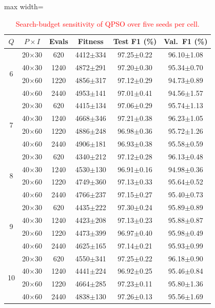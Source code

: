\documentclass[11pt]{article}
\begin{document}
\begin{table}[H]
\centering
\scriptsize
\caption{\textcolor{red}{Search-budget sensitivity of QPSO over five seeds per cell.}}

\color{red}
\setlength{\tabcolsep}{3pt}
\begin{adjustbox}{max width=\linewidth}
\begin{tabular}{cccccc}
\hline\toprule
$Q$ & $P{\times}I$ & Evals & Fitness & Test F1 (\%) & Val.\ F1 (\%) \\
\hline\toprule
\multirow{4}{*}{6} & 20$\times$30 & 620 & 4412$\pm$334 & 97.25$\pm$0.22 & 96.10$\pm$1.08 \\
 & 40$\times$30 & 1240 & 4872$\pm$291 & 97.20$\pm$0.30 & 95.34$\pm$0.70 \\
 & 20$\times$60 & 1220 & 4856$\pm$317 & 97.12$\pm$0.29 & 94.73$\pm$0.89 \\
 & 40$\times$60 & 2440 & 4953$\pm$141 & 97.01$\pm$0.41 & 94.56$\pm$1.57 \\
\midrule
\multirow{4}{*}{7} & 20$\times$30 & 620 & 4415$\pm$134 & 97.06$\pm$0.29 & 95.74$\pm$1.13 \\
 & 40$\times$30 & 1240 & 4668$\pm$346 & 97.21$\pm$0.38 & 96.23$\pm$1.05 \\
 & 20$\times$60 & 1220 & 4886$\pm$248 & 96.98$\pm$0.36 & 95.72$\pm$1.26 \\
 & 40$\times$60 & 2440 & 4906$\pm$181 & 96.93$\pm$0.38 & 95.58$\pm$0.59 \\
\midrule
\multirow{4}{*}{8} & 20$\times$30 & 620 & 4340$\pm$212 & 97.12$\pm$0.28 & 96.13$\pm$0.48 \\
 & 40$\times$30 & 1240 & 4530$\pm$130 & 96.91$\pm$0.16 & 94.98$\pm$0.36 \\
 & 20$\times$60 & 1220 & 4749$\pm$360 & 97.13$\pm$0.33 & 95.64$\pm$0.52 \\
 & 40$\times$60 & 2440 & 4766$\pm$237 & 97.15$\pm$0.27 & 95.40$\pm$0.73 \\
\midrule
\multirow{4}{*}{9} & 20$\times$30 & 620 & 4435$\pm$222 & 97.30$\pm$0.24 & 95.89$\pm$0.89 \\
 & 40$\times$30 & 1240 & 4423$\pm$208 & 97.13$\pm$0.23 & 95.88$\pm$0.87 \\
 & 20$\times$60 & 1220 & 4473$\pm$399 & 96.97$\pm$0.40 & 95.98$\pm$0.49 \\
 & 40$\times$60 & 2440 & 4625$\pm$165 & 97.14$\pm$0.21 & 95.93$\pm$0.99 \\
\midrule
\multirow{4}{*}{10} & 20$\times$30 & 620 & 4550$\pm$341 & 97.25$\pm$0.22 & 96.18$\pm$0.90 \\
 & 40$\times$30 & 1240 & 4441$\pm$224 & 96.92$\pm$0.25 & 95.46$\pm$0.84 \\
 & 20$\times$60 & 1220 & 4664$\pm$285 & 97.23$\pm$0.11 & 95.80$\pm$1.36 \\
 & 40$\times$60 & 2440 & 4838$\pm$130 & 97.26$\pm$0.13 & 95.56$\pm$1.69 \\
\hline\toprule
\end{tabular}
\end{adjustbox}
\end{table}
\end{document}
